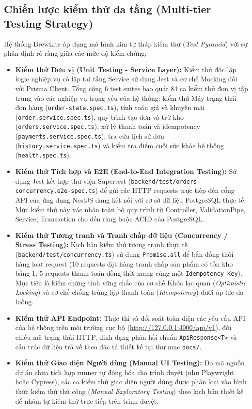 \documentclass[12pt,a4paper,oneside]{report}
\begin{document}
\subsection{Chiến lược kiểm thử đa tầng (Multi-tier Testing Strategy)}
Hệ thống BrewLite áp dụng mô hình kim tự tháp kiểm thử (\textit{Test Pyramid}) với sự phân định rõ ràng giữa các mức độ kiểm chứng:
\begin{itemize}
    \item \textbf{Kiểm thử Đơn vị (Unit Testing - Service Layer):} Kiểm thử độc lập logic nghiệp vụ cô lập tại tầng Service sử dụng Jest và cơ chế Mocking đối với Prisma Client. Tổng cộng 6 test suites bao quát 84 ca kiểm thử đơn vị tập trung vào các nghiệp vụ trọng yếu của hệ thống: kiểm thử Máy trạng thái đơn hàng (\texttt{order-state.spec.ts}), tính toán giá và khuyến mãi (\texttt{order.service.spec.ts}), quy trình tạo đơn và trừ kho (\texttt{orders.service.spec.ts}), xử lý thanh toán và idempotency (\texttt{payments.service.spec.ts}), tra cứu lịch sử đơn (\texttt{history.service.spec.ts}) và kiểm tra điểm cuối sức khỏe hệ thống (\texttt{health.spec.ts}).
    \item \textbf{Kiểm thử Tích hợp và E2E (End-to-End Integration Testing):} Sử dụng Jest kết hợp thư viện Supertest (\texttt{backend/test/orders-concurrency.e2e-spec.ts}) để gửi các HTTP requests trực tiếp đến cổng API của ứng dụng NestJS đang kết nối với cơ sở dữ liệu PostgreSQL thực tế. Mức kiểm thử này xác nhận toàn bộ quy trình từ Controller, ValidationPipe, Service, Transaction cho đến ràng buộc ACID của PostgreSQL.
    \item \textbf{Kiểm thử Tương tranh và Tranh chấp dữ liệu (Concurrency / Stress Testing):} Kịch bản kiểm thử tương tranh thực tế (\texttt{backend/test/concurrency.ts}) sử dụng \texttt{Promise.all} để bắn đồng thời hàng loạt request (10 requests đặt hàng tranh chấp sản phẩm có tồn kho bằng 1; 5 requests thanh toán đồng thời mang cùng một \texttt{Idempotency-Key}). Mục tiêu là kiểm chứng tính vững chắc của cơ chế Khóa lạc quan (\textit{Optimistic Locking}) và cơ chế chống trùng lặp thanh toán (\textit{Idempotency}) dưới áp lực đa luồng.
    \item \textbf{Kiểm thử API Endpoint:} Thực thi và đối soát toàn diện các yêu cầu API của hệ thống trên môi trường cục bộ (\url{http://127.0.0.1:4000}\allowbreak\url{/api/v1}), đối chiếu mã trạng thái HTTP, định dạng phản hồi chuẩn \texttt{ApiResponse<T>} và cấu trúc dữ liệu trả về theo đặc tả thiết kế tại thư mục \texttt{docs/}.
    \item \textbf{Kiểm thử Giao diện Người dùng (Manual UI Testing):} Do mã nguồn dự án chưa tích hợp runner tự động hóa cho trình duyệt (như Playwright hoặc Cypress), các ca kiểm thử giao diện người dùng được phân loại vào hình thức kiểm thử thủ công (\textit{Manual Exploratory Testing}) theo kịch bản thiết kế để nhóm tự kiểm thử trực tiếp trên trình duyệt.
\end{itemize}
\end{document}
